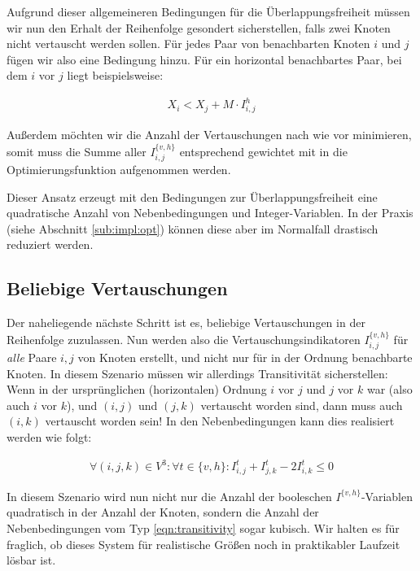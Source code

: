 Aufgrund dieser allgemeineren Bedingungen für die Überlappungsfreiheit müssen wir nun den Erhalt der Reihenfolge gesondert sicherstellen, falls zwei Knoten nicht vertauscht werden sollen. Für jedes Paar von benachbarten Knoten $i$ und $j$ fügen wir also eine Bedingung hinzu. Für ein horizontal benachbartes Paar, bei dem $i$ vor $j$ liegt beispielsweise:

\begin{align}
	X_i < X_j + M \cdot I^{h}_{i,j}
\end{align}

Außerdem möchten wir die Anzahl der Vertauschungen nach wie vor minimieren, somit muss die Summe aller $I^{\{v,h\}}_{i,j}$ entsprechend gewichtet mit in die Optimierungsfunktion aufgenommen werden.

Dieser Ansatz erzeugt mit den Bedingungen zur Überlappungsfreiheit eine quadratische Anzahl von Nebenbedingungen und Integer-Variablen. In der Praxis (siehe Abschnitt \ref{sub:impl:opt}) können diese aber im Normalfall drastisch reduziert werden.

\subsection{Beliebige Vertauschungen}

Der naheliegende nächste Schritt ist es, beliebige Vertauschungen in der Reihenfolge zuzulassen. Nun werden also die Vertauschungsindikatoren $I^{\{v,h\}}_{i,j}$ für \textit{alle} Paare $i,j$ von Knoten erstellt, und nicht nur für in der Ordnung benachbarte Knoten. In diesem Szenario müssen wir allerdings Transitivität sicherstellen: Wenn in der ursprünglichen (horizontalen) Ordnung $i$ vor $j$ und $j$ vor $k$ war (also auch $i$ vor $k$), und $(i,j)$ und $(j,k)$ vertauscht worden sind, dann muss auch $(i,k)$ vertauscht worden sein! In den Nebenbedingungen kann dies realisiert werden wie folgt:

\begin{align}
	\forall (i,j,k) \in V^3 : \forall t \in \{v,h\} :  I^{t}_{i,j} + I^{t}_{j,k} - 2 I^{t}_{i,k} \leq 0 \label{eqn:transitivity}
\end{align}

In diesem Szenario wird nun nicht nur die Anzahl der booleschen $I^{\{v,h\}}$-Variablen quadratisch in der Anzahl der Knoten, sondern die Anzahl der Nebenbedingungen vom Typ \ref{eqn:transitivity} sogar kubisch. Wir halten es für fraglich, ob dieses System für realistische Größen noch in praktikabler Laufzeit lösbar ist.

